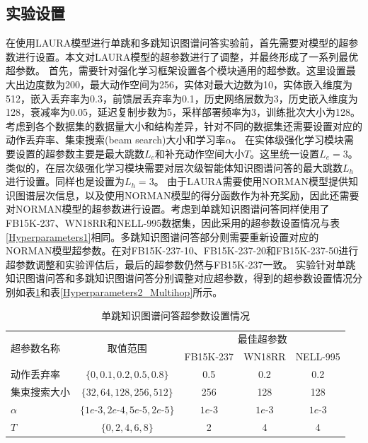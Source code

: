 \documentclass[algorithmlist, AutoFakeBold, AutoFakeSlant, figurelist, tablelist, nomlist, engineering]{seuthesix}
\begin{document}
\subsection{实验设置}
在使用LAURA模型进行单跳和多跳知识图谱问答实验前，首先需要对模型的超参数进行设置。本文对LAURA模型的超参数进行了调整，并最终形成了一系列最优超参数。
首先，需要针对强化学习框架设置各个模块通用的超参数。这里设置最大出边度数为200，最大动作空间为256，实体对最大边数为10，实体嵌入维度为512，嵌入丢弃率为0.3，前馈层丢弃率为0.1，历史网络层数为3，历史嵌入维度为128，衰减率为0.05，延迟复制步数为5，采样部署频率为3，训练批次大小为128。
考虑到各个数据集的数据量大小和结构差异，针对不同的数据集还需要设置对应的动作丢弃率、集束搜索(beam search)大小和学习率$\alpha$。
在实体级强化学习模块需要设置的超参数主要是最大跳数$L_e$和补充动作空间大小$T$。这里统一设置$L_e = 3$。
类似的，在层次级强化学习模块需要对层次级智能体知识图谱问答的最大跳数$L_h$进行设置。同样也是设置为$L_h = 3$。
由于LAURA需要使用NORMAN模型提供知识图谱层次信息，以及使用NORMAN模型的得分函数作为补充奖励，因此还需要对NORMAN模型的超参数进行设置。考虑到单跳知识图谱问答同样使用了FB15K-237、WN18RR和NELL-995数据集，因此采用的超参数设置情况与表\ref{Hyperparameters1}相同。多跳知识图谱问答部分则需要重新设置对应的NORMAN模型超参数。在对FB15K-237-10、FB15K-237-20和FB15K-237-50进行超参数调整和实验评估后，最后的超参数仍然与FB15K-237一致。
实验针对单跳知识图谱问答和多跳知识图谱问答分别调整对应超参数，得到的超参数设置情况分别如表\ref{Hyperparameters2_Singlehop}和表\ref{Hyperparameters2_Multihop}所示。

\begin{table}[]
  \centering
  \begin{tabular*}{0.95\textwidth}{@{\extracolsep{\fill}}lcccc}
  \toprule[1pt]
  \multirow{2}{*}{超参数名称} & \multirow{2}{*}{取值范围} & \multicolumn{3}{c}{最佳超参数}\\ 
    &  & FB15K-237 & WN18RR & NELL-995 \\ \hline
  动作丢弃率 & $\{0, 0.1, 0.2, 0.5, 0.8\}$ & 0.5 & 0.2 & 0.2 \\
  集束搜索大小 & $\{32, 64, 128, 256, 512\}$ & 256 & 128 & 128 \\
  $\alpha$ & $\{1e\text{-}3, 2e\text{-}4, 5e\text{-}5, 2e\text{-}5\}$ & $1e\text{-}3$ & $1e\text{-}3$ & $1e\text{-}3$ \\
  $T$ & $\{0, 2, 4, 6, 8\}$ & 2 & 4 & 4 \\
  \bottomrule[1pt]
  \end{tabular*}
  \caption{单跳知识图谱问答超参数设置情况}
  \label{Hyperparameters2_Singlehop}
\end{table}
\end{document}

